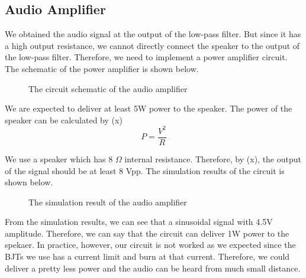 \documentclass[conference]{IEEEtran}
\begin{document}
\subsection{Audio Amplifier}
\par We obtained the audio signal at the output of the low-pass filter. But since it has a high output resistance, we cannot directly connect 
the speaker to the output of the low-pass filter. Therefore, we need to implement a power amplifier circuit. The schematic of the power 
amplifier is shown below. 
\begin{figure}[H]
   \centerline{}
    \caption{The circuit schematic of the audio amplifier}
\end{figure}
\par We are expected to deliver at least 5W power to the speaker. The power of the speaker can be calculated by (x)
\begin{equation}
    P = \frac{V^2}{R}
\end{equation}
\par We use a speaker which has 8 \(\Omega\) internal resistance. Therefore, by (x), the output of the signal should be at least 8 Vpp. The 
simulation results of the circuit is shown below. 
\begin{figure}[H]
   \centerline{}
    \caption{The simulation result of the audio amplifier}
\end{figure}
\par From the simulation results, we can see that a sinusoidal signal with 4.5V amplitude. Therefore, we can say that the circuit can deliver 
1W power to the spekaer. In practice, however, our circuit is not worked as we expected since the BJTs we use has a current limit and burn 
at that current. Therefore, we could deliver a pretty less power and the audio can be heard from much small distance. 
\end{document}
